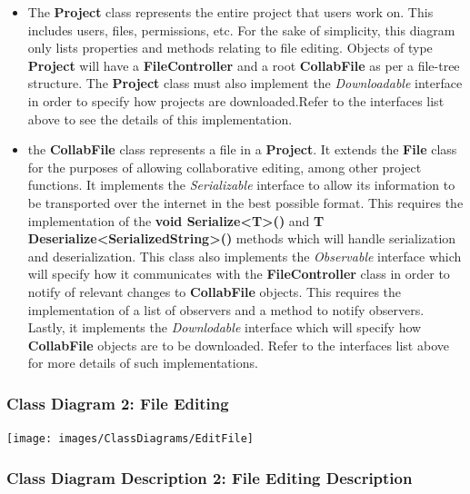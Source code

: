 \documentclass[twoside,letterpaper]{article}
\begin{document}
{\begin{itemize}
	\item The \textbf{Project} class represents the entire project that users work on. This includes users, files, permissions, etc. For the sake of simplicity, this diagram only lists properties and methods relating to file editing. Objects of type \textbf{Project} will have a \textbf{FileController} and a root \textbf{CollabFile} as per a file-tree structure. The \textbf{Project} class must also implement the \textit{Downloadable} interface in order to specify how projects are downloaded.Refer to the interfaces list above to see the details of this implementation.
	\item the \textbf{CollabFile} class represents a file in a \textbf{Project}. It extends the \textbf{File} class for the purposes of allowing collaborative editing, among other project functions. It implements the \textit{Serializable} interface to allow its information to be transported over the internet in the best possible format. This requires the implementation of the \textbf{void Serialize<T>()} and \textbf{T Deserialize<SerializedString>()} methods which will handle serialization and deserialization. This class also implements the \textit{Observable} interface which will specify how it communicates with the \textbf{FileController} class in order to notify of relevant changes to \textbf{CollabFile} objects. This requires the implementation of a list of observers and a method to notify observers. Lastly, it implements the \textit{Downlodable} interface which will specify how \textbf{CollabFile} objects are to be downloaded. Refer to the interfaces list above for more details of such implementations.
\end{itemize}

\subsubsection[Class Diagram 2: File Editing]{\rmfamily\bfseries\color{black}
	Class Diagram 2: File Editing}
\hypertarget{RefHeading22059017292}{}
\bigskip

\texttt{[image: images/ClassDiagrams/EditFile]}

\newpage

\subsubsection[Class Diagram Description 2: File Editing Description]{\rmfamily\bfseries\color{black}
	Class Diagram Description 2: File Editing Description}
\hypertarget{RefHeading22059017292}{}

}
\end{document}

